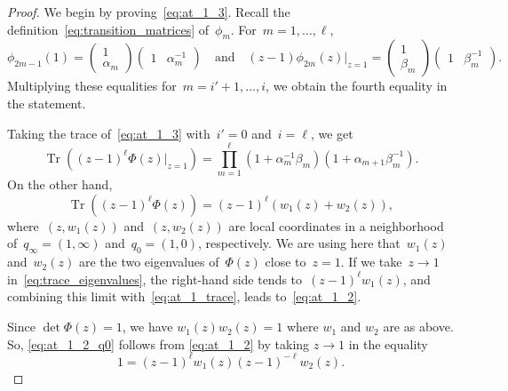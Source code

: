 \documentclass[11pt]{article}
\theoremstyle{plain}
\theoremstyle{definition}
\numberwithin{equation}{section}
\DeclareMathOperator{\Tr}{Tr}
\begin{document}
\begin{proof}
We begin by proving~\eqref{eq:at_1_3}. Recall the definition~\eqref{eq:transition_matrices} of~$\phi_m$. For~$m=1,\dots,\ell$,
\begin{equation}
\phi_{2m-1}(1)=
\begin{pmatrix}
1 \\
\alpha_m
\end{pmatrix}
\begin{pmatrix}
1 & \alpha_m^{-1}
\end{pmatrix}
\quad \text{and} \quad 
(z-1)\phi_{2m}(z)|_{z=1}=
\begin{pmatrix}
1 \\
\beta_m
\end{pmatrix}
\begin{pmatrix}
1 & \beta_m^{-1}
\end{pmatrix}.
\end{equation}
Multiplying these equalities for~$m=i'+1,\dots,i$, we obtain the fourth equality in the statement.

Taking the trace of~\eqref{eq:at_1_3} with~$i'=0$ and~$i=\ell$, we get
\begin{equation}\label{eq:at_1_trace}
\Tr\left((z-1)^\ell \Phi(z)|_{z=1}\right)=\prod_{m=1}^\ell(1+\alpha_m^{-1}\beta_m)(1+\alpha_{m+1}\beta_m^{-1}).
\end{equation}
On the other hand,
\begin{equation}\label{eq:trace_eigenvalues}
\Tr\left((z-1)^\ell \Phi(z)\right)=(z-1)^\ell(w_1(z)+w_2(z)),
\end{equation}
where~$(z,w_1(z))$ and~$(z,w_2(z))$ are local coordinates in a neighborhood of~$q_\infty=(1,\infty)$ and~$q_0=(1,0)$, respectively. We are using here that~$w_1(z)$ and~$w_2(z)$ are the two eigenvalues of~$\Phi(z)$ close to~$z=1$. If we take~$z\to 1$ in~\eqref{eq:trace_eigenvalues}, the right-hand side tends to~$(z-1)^\ell w_1(z)$, and combining this limit with~\eqref{eq:at_1_trace}, leads to~\eqref{eq:at_1_2}.

Since $\det \Phi(z)=1$, we have $w_1(z)w_2(z)=1$ where $w_1$ and $w_2$ are as above. So, \eqref{eq:at_1_2_q0} follows from \eqref{eq:at_1_2} by taking $z\to 1$ in the equality
\begin{equation}
1=(z-1)^\ell w_1(z) (z-1)^{-\ell} w_2(z).
\end{equation}


\end{proof}
\end{document}
